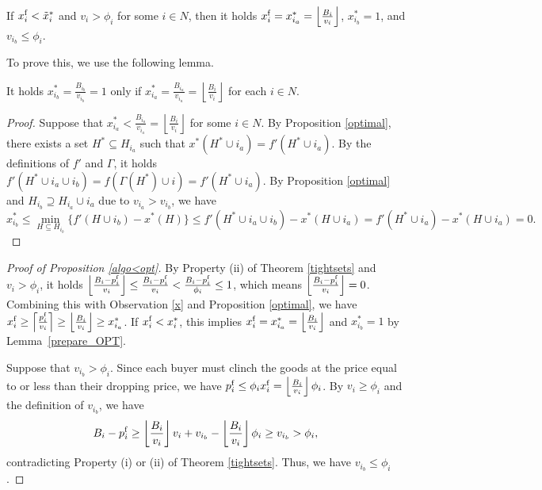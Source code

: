 \documentclass[letterpaper,11pt]{article}
\begin{document}
	\begin{proposition}
	\label{algo<opt}
	If $x^{\rm f}_i<\tilde{x}^*_i$ and $v_i> \phi_i$ for some $i\in N$, then it holds $x^{\rm f}_i=x^*_{i_{a}}=\left\lfloor \frac{B_i}{v_i}\right\rfloor$,
	$x^*_{i_{b}}=1$, and $v_{i_{b}}\leq \phi_i$.
	\end{proposition}
	To prove this, we use the following lemma.
	\begin{lemma}
	\label{prepare_OPT}
	It holds $x^*_{i_{b}}=\frac{B_{i_b}}{v_{i_b}}=1$ only if $x^*_{i_{a}}
	=\frac{B_{i_a}}{v_{i_a}}=\left\lfloor \frac{B_i}{v_i}\right\rfloor$ for each $i\in N$. 
	\end{lemma} 
	\begin{proof}
	Suppose that $x^*_{i_{a}}<\frac{B_{i_a}}{v_{i_a}}=\left\lfloor \frac{B_i}{v_i}\right\rfloor$ 
	for some $i\in N$. 
	By Proposition \ref{optimal}, there exists a set $H^*\subseteq H_{i_{a}}$ such that 
	$x^*(H^*\cup i_{a})=f'(H^*\cup i_{a})$.
	By the definitions of $f'$ and $\Gamma$, 
	it holds $f'(H^*\cup i_{a}\cup i_{b})=f(\Gamma(H^*)\cup i)=f'(H^*\cup i_{a})$. 
	By Proposition \ref{optimal} and 
	$H_{i_{b}}\supseteq H_{i_{a}}\cup i_{a}$ due to $v_{i_{a}}>v_{i_{b}}$, 
	we have 
	\[
	x^*_{i_{b}}\leq\min_{H\subseteq H_{{i_{b}}}}\{f'(H\cup i_{b})-x^*(H)\}
	\leq f'(H^*\cup i_{a} \cup i_{b})-x^*(H\cup i_{a})=f'(H^*\cup i_{a})-x^*(H\cup i_{a})=0.
	\]
	\end{proof}


	
	\begin{proof}[Proof of Proposition \ref{algo<opt}]
	By Property (ii) of Theorem \ref{tightsets} and $v_i>\phi_i$, 
	it holds $\left\lfloor \frac{B_i-p^{\rm f}_i}{v_i} \right\rfloor\leq 
	\frac{B_i-p^{\rm f}_i}{v_i}<\frac{B_i-p^{\rm f}_i}{\phi_i}\leq 1$, 
	which means $\left\lfloor \frac{B_i-p^{\rm f}_i}{v_i}\right\rfloor =0$.
	Combining this with Observation \ref{x} and Proposition \ref{optimal}, we have 
	$x^{\rm f}_i\geq \left\lceil \frac{p^{\rm f}_i}{v_i}\right\rceil \geq \left\lfloor \frac{B_i}{v_i}\right\rfloor\geq x^*_{i_{a}}$.
	If $x^{\rm f}_i<x^*_i$, this implies 
	$x^{\rm f}_i=x^*_{i_{a}}=\left\lfloor \frac{B_i}{v_i}\right\rfloor$ and $x^*_{i_{b}}=1$
	by Lemma~\ref{prepare_OPT}.

	Suppose that $v_{i_{b}}>\phi_i$. 
	Since each buyer must clinch the goods at the price equal to or less than their dropping price,  
	we have $p^{\rm f}_i\leq \phi_i x^{\rm f}_i= \left\lfloor \frac{B_i}{v_i}\right\rfloor\phi_i$.
	By $v_i\geq\phi_i$ and the definition of $v_{i_{b}}$, we have
	\begin{eqnarray*}
	B_i-p^{\rm f}_i \geq  \left\lfloor\frac{B_i}{v_i}\right\rfloor v_i+v_{i_{b}}-
	\left\lfloor \frac{B_i}{v_i}\right\rfloor \phi_i
	\geq v_{i_{b}}>\phi_i,
	\end{eqnarray*}
	contradicting Property (i) or (ii) of Theorem \ref{tightsets}. Thus, we have $v_{i_{b}}\leq \phi_i$.
	\end{proof}
	
\end{document}
